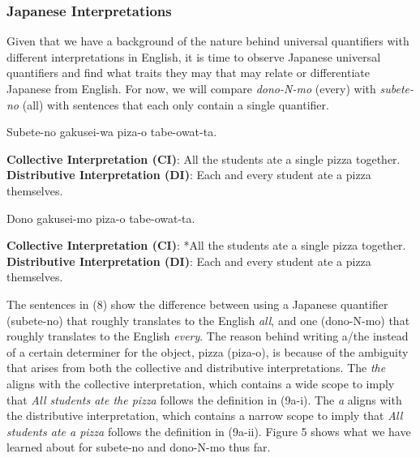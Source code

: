\documentclass[english, 11pt]{article}
\begin{document}
\subsubsection{Japanese Interpretations}
Given that we have a background of the nature behind universal quantifiers with different interpretations in English, it is time to observe Japanese universal quantifiers and find what traits they may that may relate or differentiate Japanese from English. For now, we will compare \emph{dono-N-mo} (every) with \emph{subete-no} (all) with sentences that each only contain a single quantifier.
\begin{exe}
	\ex 
	\begin{xlist}
		\label{1b}
		\label{1a}
	\end{xlist}
\end{exe}
\begin {exe}
	\ex 
		\begin {xlist}
			\ex Subete-no gakusei-wa piza-o tabe-owat-ta.
				\begin {xlist} 
					\ex \textbf{Collective Interpretation (CI)}: All the students ate a single pizza together.
					\ex \textbf{Distributive Interpretation (DI)}: Each and every student ate a pizza themselves.
				\end {xlist}
			\ex Dono gakusei-mo piza-o tabe-owat-ta.
			\begin {xlist} 
				\ex \textbf{Collective Interpretation (CI)}: *All the students ate a single pizza together.
				\ex \textbf{Distributive Interpretation (DI)}: Each and every student ate a pizza themselves.
			\end {xlist}
	\end {xlist}
\end {exe}
The sentences in (8) show the difference between using a Japanese quantifier (subete-no) that roughly translates to the English \emph{all}, and one (dono-N-mo) that roughly translates to the English \emph{every}. The reason behind writing a/the instead of a certain determiner for the object, pizza (piza-o), is because of the ambiguity that arises from both the collective and distributive interpretations. The \emph{the} aligns with the collective interpretation, which contains a wide scope to imply that \emph{All students ate the pizza} follows the definition in (9a-i). The \emph{a} aligns with the distributive interpretation, which contains a narrow scope to imply that \emph{All students ate a pizza} follows the definition in (9a-ii). Figure 5 shows what we have learned about for subete-no and dono-N-mo thus far.
\end{document}

